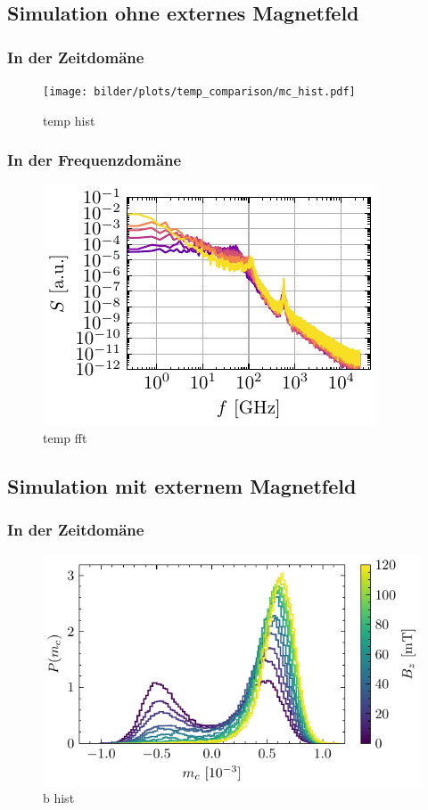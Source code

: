 \documentclass[main.tex]{subfiles}
\begin{document}
\subsection{Simulation ohne externes Magnetfeld}
\subsubsection{In der Zeitdomäne}
\begin{figure}[H]
    \centering
    \texttt{[image: bilder/plots/temp\_comparison/mc\_hist.pdf]}
    \caption{temp hist}\label{fig:temp-hist}    
\end{figure}

\subsubsection{In der Frequenzdomäne}

\begin{figure}[H]
    \centering
    \includegraphics{bilder/plots/temp_comparison/spectral_power_density.pdf}
    \caption{temp fft}\label{fig:temp-fft}
\end{figure}


\subsection{Simulation mit externem Magnetfeld}
\subsubsection{In der Zeitdomäne}

\begin{figure}[H]
    \centering
    \includegraphics{bilder/plots/max_Bz/mc_hist.pdf}
    \caption{b hist}\label{fig:b-hist}    
\end{figure}
\end{document}
